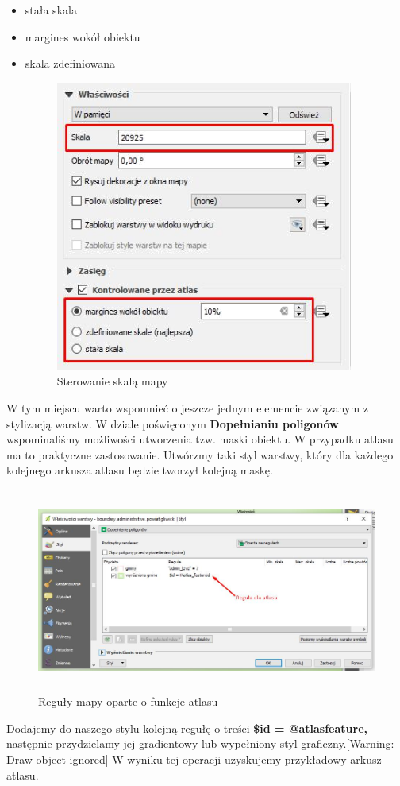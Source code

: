 \documentclass[12pt,a4paper]{book}
\begin{document}
\begin{itemize}
\item stała skala
\item margines wokół obiektu
\item skala zdefiniowana
\begin{center}
\begin{figure}
\includegraphics[width=9.797cm,height=9.581cm]{008-atlas-skala.png}
\caption{Sterowanie skalą mapy}
\end{figure}
\end{center}
\end{itemize}
W tym miejscu warto wspomnieć o jeszcze jednym elemencie związanym z stylizacją warstw. W dziale poświęconym \textbf{Dopełnianiu poligonów }wspominaliśmy\textbf{ }możliwości utworzenia tzw. maski obiektu. W przypadku atlasu ma to praktyczne zastosowanie. Utwórzmy taki styl warstwy, który dla każdego kolejnego arkusza atlasu będzie tworzył kolejną maskę.



\begin{center}
\begin{figure}
\includegraphics[width=13.998cm,height=6.682cm]{008-atlas-reguly.jpg}
\caption{Reguły mapy oparte o funkcje atlasu}
\end{figure}
\end{center}
Dodajemy do naszego stylu kolejną regułę o treści \textbf{\$id = @atlasfeature, }następnie przydzielamy jej gradientowy lub wypełniony styl graficzny.[Warning: Draw object ignored] W wyniku tej operacji uzyskujemy przykładowy arkusz atlasu.
\end{document}
